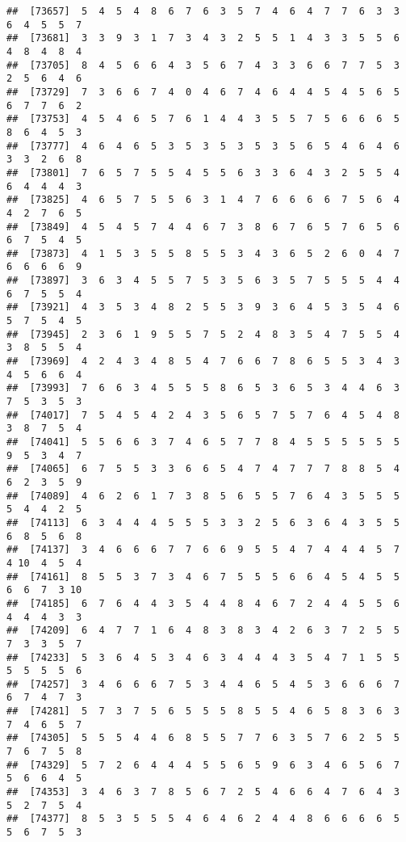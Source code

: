\documentclass[
]{book}
\begin{document}
\begin{verbatim}
##  [73657]  5  4  5  4  8  6  7  6  3  5  7  4  6  4  7  7  6  3  3  6  4  5  5  7
##  [73681]  3  3  9  3  1  7  3  4  3  2  5  5  1  4  3  3  5  5  6  4  8  4  8  4
##  [73705]  8  4  5  6  6  4  3  5  6  7  4  3  3  6  6  7  7  5  3  2  5  6  4  6
##  [73729]  7  3  6  6  7  4  0  4  6  7  4  6  4  4  5  4  5  6  5  6  7  7  6  2
##  [73753]  4  5  4  6  5  7  6  1  4  4  3  5  5  7  5  6  6  6  5  8  6  4  5  3
##  [73777]  4  6  4  6  5  3  5  3  5  3  5  3  5  6  5  4  6  4  6  3  3  2  6  8
##  [73801]  7  6  5  7  5  5  4  5  5  6  3  3  6  4  3  2  5  5  4  6  4  4  4  3
##  [73825]  4  6  5  7  5  5  6  3  1  4  7  6  6  6  6  7  5  6  4  4  2  7  6  5
##  [73849]  4  5  4  5  7  4  4  6  7  3  8  6  7  6  5  7  6  5  6  6  7  5  4  5
##  [73873]  4  1  5  3  5  5  8  5  5  3  4  3  6  5  2  6  0  4  7  6  6  6  6  9
##  [73897]  3  6  3  4  5  5  7  5  3  5  6  3  5  7  5  5  5  4  4  6  7  5  5  4
##  [73921]  4  3  5  3  4  8  2  5  5  3  9  3  6  4  5  3  5  4  6  5  7  5  4  5
##  [73945]  2  3  6  1  9  5  5  7  5  2  4  8  3  5  4  7  5  5  4  3  8  5  5  4
##  [73969]  4  2  4  3  4  8  5  4  7  6  6  7  8  6  5  5  3  4  3  4  5  6  6  4
##  [73993]  7  6  6  3  4  5  5  5  8  6  5  3  6  5  3  4  4  6  3  7  5  3  5  3
##  [74017]  7  5  4  5  4  2  4  3  5  6  5  7  5  7  6  4  5  4  8  3  8  7  5  4
##  [74041]  5  5  6  6  3  7  4  6  5  7  7  8  4  5  5  5  5  5  5  9  5  3  4  7
##  [74065]  6  7  5  5  3  3  6  6  5  4  7  4  7  7  7  8  8  5  4  6  2  3  5  9
##  [74089]  4  6  2  6  1  7  3  8  5  6  5  5  7  6  4  3  5  5  5  5  4  4  2  5
##  [74113]  6  3  4  4  4  5  5  5  3  3  2  5  6  3  6  4  3  5  5  6  8  5  6  8
##  [74137]  3  4  6  6  6  7  7  6  6  9  5  5  4  7  4  4  4  5  7  4 10  4  5  4
##  [74161]  8  5  5  3  7  3  4  6  7  5  5  5  6  6  4  5  4  5  5  6  6  7  3 10
##  [74185]  6  7  6  4  4  3  5  4  4  8  4  6  7  2  4  4  5  5  6  4  4  4  3  3
##  [74209]  6  4  7  7  1  6  4  8  3  8  3  4  2  6  3  7  2  5  5  7  3  3  5  7
##  [74233]  5  3  6  4  5  3  4  6  3  4  4  4  3  5  4  7  1  5  5  5  5  5  5  6
##  [74257]  3  4  6  6  6  7  5  3  4  4  6  5  4  5  3  6  6  6  7  6  7  4  7  3
##  [74281]  5  7  3  7  5  6  5  5  5  8  5  5  4  6  5  8  3  6  3  7  4  6  5  7
##  [74305]  5  5  5  4  4  6  8  5  5  7  7  6  3  5  7  6  2  5  5  7  6  7  5  8
##  [74329]  5  7  2  6  4  4  4  5  5  6  5  9  6  3  4  6  5  6  7  5  6  6  4  5
##  [74353]  3  4  6  3  7  8  5  6  7  2  5  4  6  6  4  7  6  4  3  5  2  7  5  4
##  [74377]  8  5  3  5  5  5  4  6  4  6  2  4  4  8  6  6  6  6  5  5  6  7  5  3

\end{verbatim}
\end{document}
